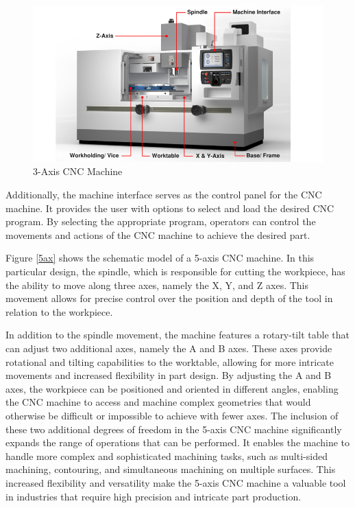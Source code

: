  
\begin{figure}[H]
	\centerline{\includegraphics[scale=.6]{figures/basicCNC.jpg}}
	\caption{3-Axis CNC Machine~\cite{3ax}}
	\label{3ax}
\end{figure}

Additionally, the machine interface serves as the control panel for the CNC machine. It provides the user with options to select and load the desired CNC program. By selecting the appropriate program, operators can control the movements and actions of the CNC machine to achieve the desired part.

\newpage
Figure \ref{5ax} shows the schematic model of a 5-axis CNC machine. In this particular design, the spindle, which is responsible for cutting the workpiece, has the ability to move along three axes, namely the X, Y, and Z axes. This movement allows for precise control over the position and depth of the tool in relation to the workpiece.

In addition to the spindle movement, the machine features a rotary-tilt table that can adjust two additional axes, namely the A and B axes. These axes provide rotational and tilting capabilities to the worktable, allowing for more intricate movements and increased flexibility in part design. By adjusting the A and B axes, the workpiece can be positioned and oriented in different angles, enabling the CNC machine to access and machine complex geometries that would otherwise be difficult or impossible to achieve with fewer axes. %
The inclusion of these two additional degrees of freedom in the 5-axis CNC machine significantly expands the range of operations that can be performed. It enables the machine to handle more complex and sophisticated machining tasks, such as multi-sided machining, contouring, and simultaneous machining on multiple surfaces. This increased flexibility and versatility make the 5-axis CNC machine a valuable tool in industries that require high precision and intricate part production.

